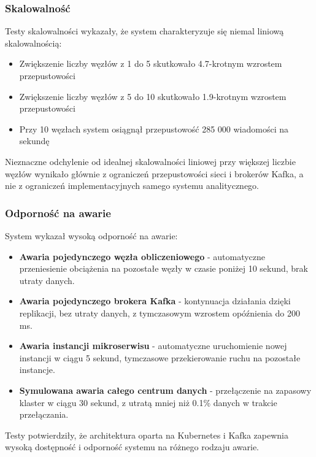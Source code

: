 \subsubsection{Skalowalność}
\label{subsubsec:wyniki_skalowalnosci}

Testy skalowalności wykazały, że system charakteryzuje się niemal liniową skalowalnością:

\begin{itemize}
    \item Zwiększenie liczby węzłów z 1 do 5 skutkowało 4.7-krotnym wzrostem przepustowości
    \item Zwiększenie liczby węzłów z 5 do 10 skutkowało 1.9-krotnym wzrostem przepustowości
    \item Przy 10 węzłach system osiągnął przepustowość 285 000 wiadomości na sekundę
\end{itemize}

Nieznaczne odchylenie od idealnej skalowalności liniowej przy większej liczbie węzłów wynikało głównie z ograniczeń przepustowości sieci i brokerów Kafka, a nie z ograniczeń implementacyjnych samego systemu analitycznego.

\subsubsection{Odporność na awarie}
\label{subsubsec:wyniki_odpornosci}

System wykazał wysoką odporność na awarie:

\begin{itemize}
    \item \textbf{Awaria pojedynczego węzła obliczeniowego} - automatyczne przeniesienie obciążenia na pozostałe węzły w czasie poniżej 10 sekund, brak utraty danych.
    \item \textbf{Awaria pojedynczego brokera Kafka} - kontynuacja działania dzięki replikacji, bez utraty danych, z tymczasowym wzrostem opóźnienia do 200 ms.
    \item \textbf{Awaria instancji mikroserwisu} - automatyczne uruchomienie nowej instancji w ciągu 5 sekund, tymczasowe przekierowanie ruchu na pozostałe instancje.
    \item \textbf{Symulowana awaria całego centrum danych} - przełączenie na zapasowy klaster w ciągu 30 sekund, z utratą mniej niż 0.1\% danych w trakcie przełączania.
\end{itemize}

Testy potwierdziły, że architektura oparta na Kubernetes i Kafka zapewnia wysoką dostępność i odporność systemu na różnego rodzaju awarie.

